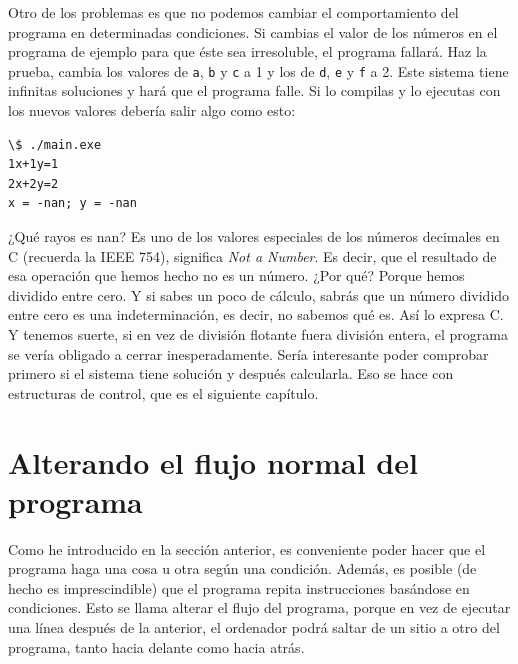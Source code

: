 \documentclass[a4paper]{article}
\begin{document}
Otro de los problemas es que no podemos cambiar el comportamiento del programa
en determinadas condiciones. Si cambias el valor de los números en el
programa de ejemplo para que éste sea irresoluble, el programa fallará.
Haz la prueba, cambia los valores de \texttt{a}, \texttt{b}
y \texttt{c} a 1 y los de \texttt{d}, \texttt{e} y \texttt{f} a 2. Este
sistema tiene infinitas soluciones y hará que el programa falle. Si lo compilas
y lo ejecutas con los nuevos valores debería salir algo como esto:



\noindent
\begin{minipage}[H]{\linewidth}
\mbox{}
\begin{lstlisting}[style=terminalStyle]
\$ ./main.exe
1x+1y=1
2x+2y=2
x = -nan; y = -nan
\end{lstlisting}
\end{minipage}


¿Qué rayos es nan? Es uno de los valores especiales de los números decimales en
C (recuerda la IEEE 754), significa \textit{Not a Number}. Es decir, que el
resultado de esa operación que hemos hecho no es un número. ¿Por qué? Porque
hemos dividido entre cero. Y si sabes un poco de cálculo, sabrás que un número
dividido entre cero es una indeterminación, es decir, no sabemos qué es. Así lo
expresa C. Y tenemos suerte, si en vez de división flotante fuera división
entera, el programa se vería obligado a cerrar inesperadamente. Sería
interesante poder comprobar primero si el sistema tiene solución y después
calcularla. Eso se hace con estructuras de control, que es el siguiente
capítulo.

\section{Alterando el flujo normal del programa}
Como he introducido en la sección anterior, es conveniente poder hacer que el
programa haga una cosa u otra según una condición. Además, es posible (de hecho
es imprescindible) que el programa repita instrucciones basándose en
condiciones. Esto se llama alterar el flujo del programa, porque en vez de
ejecutar una línea después de la anterior, el ordenador podrá saltar de
un sitio a otro del programa, tanto hacia delante como hacia atrás.
\end{document}
